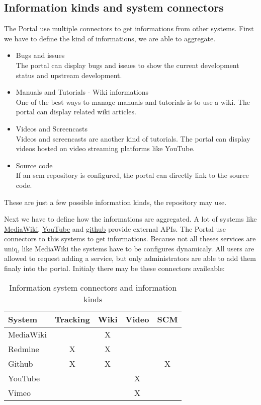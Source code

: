 \subsection[sec:information kinds and system connectors]{Information kinds and system connectors}

The Portal use multiple connectors to get informations from other systems.
First we have to define the kind of informations, we are able to aggregate.

\begin{itemize}
\item Bugs and issues\\
The portal can display bugs and issues to show the current development status and upstream development.
\item Manuals and Tutorials - Wiki informations\\
One of the best ways to manage manuals and tutorials is to use a wiki. The portal can display related wiki articles.
\item Videos and Screencasts\\
Videos and screencasts are another kind of tutorials. The portal can display videos hosted on video streaming platforms like YouTube.
\item Source code\\
If an scm repository is configured, the portal can directly link to the source code.
\end{itemize}

These are just a few possible information kinds, the repository may use.

Next we have to define how the informations are aggregated.
A lot of systems like \hyperlink{http://www.mediawiki.org/wiki/API:Main_page/de}{MediaWiki}, \hyperlink{http://code.google.com/intl/de-DE/apis/youtube/overview.html}{YouTube} and \hyperlink{http://developer.github.com/v3/}{github} provide external APIs.
The Portal use connectors to this systems to get informations.
Because not all theses services are uniq, like MediaWiki the systems have to be configures dynamicaly.
All users are allowed to request adding a service, but only administrators are able to add them finaly into the portal.
Initialy there may be these connectors availeable:

\small
\begin{longtable}{|p{}|c|c|c|c}
\caption{Information system connectors and information kinds} \\
\hline
\label{tab:information system connectors and information kinds}
\textbf{System} & \textbf{Tracking} & \textbf{Wiki} & \textbf{Video} & \textbf{SCM}
\\ \hline
 MediaWiki & & X & &
\\ \hline
 Redmine & X & X & &
\\ \hline
 Github & X & X & & X
\\ \hline
 YouTube & & & X &
\\ \hline
 Vimeo & & & X &
\\ \hline
\end{longtable}
\normalsize
